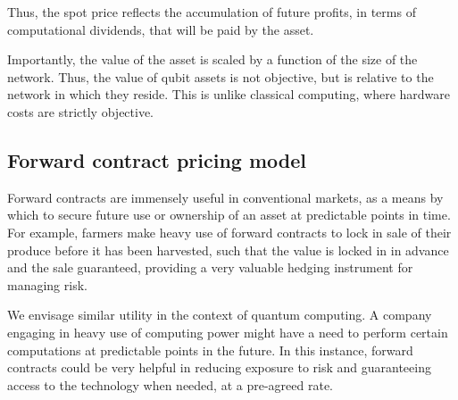 Thus, the spot price reflects the accumulation of future profits, in terms of computational dividends, that will be paid by the asset.

Importantly, the value of the asset is scaled by a function of the size of the network. Thus, the value of qubit assets is not objective, but is relative to the network in which they reside. This is unlike classical computing, where hardware costs are strictly objective.


%
%

\subsection{Forward contract pricing model}\label{sec:for_contr}


Forward contracts are immensely useful in conventional markets, as a means by which to secure future use or ownership of an asset at predictable points in time. For example, farmers make heavy use of forward contracts to lock in sale of their produce before it has been harvested, such that the value is locked in in advance and the sale guaranteed, providing a very valuable hedging instrument for managing risk.

We envisage similar utility in the context of quantum computing. A company engaging in heavy use of computing power might have a need to perform certain computations at predictable points in the future. In this instance, forward contracts could be very helpful in reducing exposure to risk and guaranteeing access to the technology when needed, at a pre-agreed rate.

